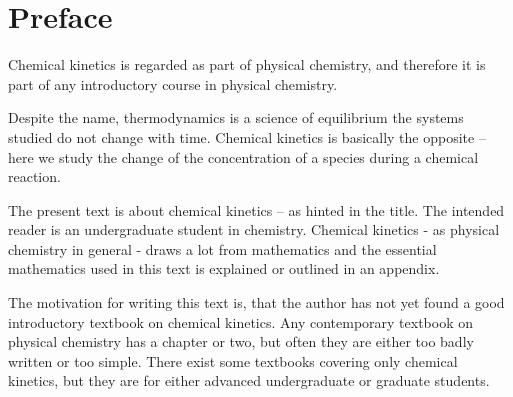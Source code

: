 
\chapter*{Preface}

Chemical kinetics is regarded as part of physical chemistry, and therefore it is part of any introductory course in physical chemistry.

Despite the name, thermodynamics is a science of equilibrium \ie the systems studied do not change with time. Chemical kinetics is basically the opposite -- here we study the change of the concentration of a species during a chemical reaction.

The present text is about chemical kinetics -- as hinted in the title. The intended reader is an undergraduate student in chemistry. Chemical kinetics - as physical chemistry in general - draws a lot from mathematics and the essential mathematics used in this text is explained or outlined in an appendix.

The motivation for writing this text is, that the author has not yet found a good introductory textbook on chemical kinetics. Any contemporary textbook on physical chemistry has a chapter or two, but often they are either too badly written or too simple. There exist some textbooks covering only chemical kinetics, but they are for either advanced undergraduate or graduate students.
